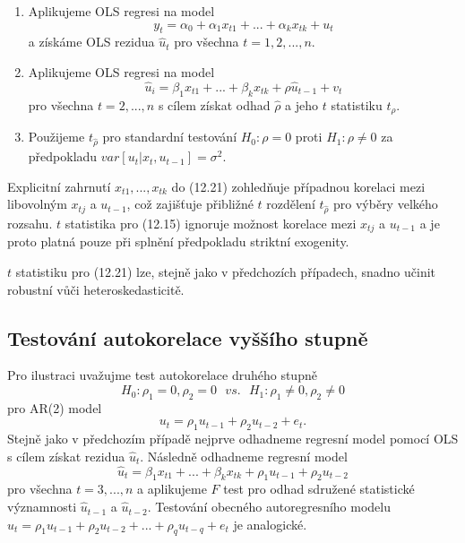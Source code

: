 \begin{enumerate}
\item Aplikujeme OLS regresi na model
\begin{equation}
y_t = \alpha_0 + \alpha_1 x_{t1} + ... + \alpha_k x_{tk} + u_t
\end{equation}
a získáme OLS rezidua $\hat{u}_t$ pro všechna $t = 1, 2, ..., n$.
\item Aplikujeme OLS regresi na model
\begin{equation}
\hat{u}_i = \beta_1 x_{t1} + ... + \beta_k x_{tk} + \rho \hat{u}_{t - 1} + v_t
\end{equation}
pro všechna $t = 2, ..., n$ s cílem získat odhad $\hat{\rho}$ a jeho $t$ statistiku $t_{\hat{\rho}}$.
\item Použijeme $t_{\hat{\rho}}$ pro standardní testování $H_0: \rho = 0$ proti $H_1: \rho \ne 0$ za předpokladu $var[u_t|x_t, u_{t - 1}] = \sigma^2$.
\end{enumerate}

Explicitní zahrnutí $x_{t1}, ..., x_{tk}$ do (12.21) zohledňuje případnou korelaci mezi libovolným $x_{tj}$ a $u_{t - 1}$, což zajišťuje přibližné $t$ rozdělení $t_{\hat{\rho}}$ pro výběry velkého rozsahu. $t$ statistika pro (12.15) ignoruje možnost korelace mezi $x_{tj}$ a $u_{t - 1}$ a je proto platná pouze při splnění předpokladu striktní exogenity.

$t$ statistiku pro (12.21) lze, stejně jako v předchozích případech, snadno učinit robustní vůči heteroskedasticitě.

\subsection{Testování autokorelace vyššího stupně}

Pro ilustraci uvažujme test autokorelace druhého stupně
\begin{equation}
H_0: \rho_1 = 0, \rho_2 = 0 ~~~ vs. ~~~ H_1: \rho_1 \ne 0, \rho_2 \ne 0
\end{equation}
pro AR(2) model
\begin{equation}
u_t = \rho_1 u_{t - 1} + \rho_2 u_{t - 2} + e_t.
\end{equation}
Stejně jako v předchozím případě nejprve odhadneme regresní model pomocí OLS s cílem získat rezidua $\hat{u}_t$. Následně odhadneme regresní model
\begin{equation}
\hat{u}_t = \beta_1 x_{t1} + ... + \beta_k x_{tk} + \rho_1 u_{t - 1} + \rho_2 u_{t - 2}
\end{equation}
pro všechna $t = 3, ..., n$ a aplikujeme $F$ test pro odhad sdružené statistické významnosti $\hat{u}_{t - 1}$ a $\hat{u}_{t - 2}$. Testování obecného autoregresního modelu $u_t = \rho_1 u_{t - 1} + \rho_2 u_{t - 2} + ... + \rho_q u_{t - q} + e_t$ je analogické.

